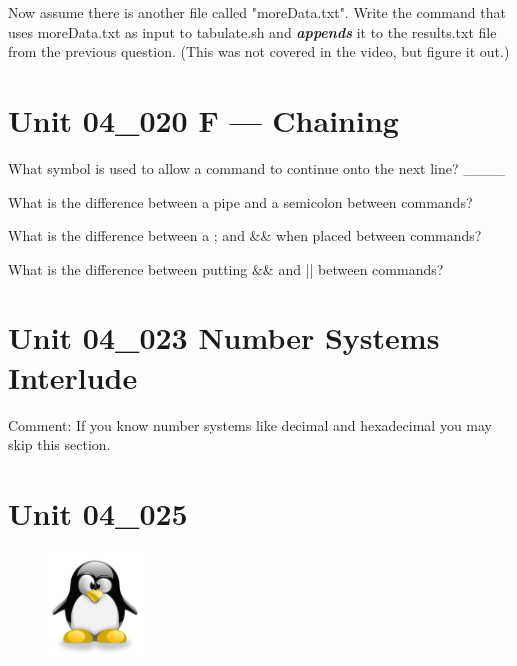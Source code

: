 \documentclass[letterpaper,12pt]{exam}
\newcommand{\unit}{Unit 04}
\begin{document}
\begin {questions}
\begin{samepage}
\question Now assume there is another file called "moreData.txt".  Write the command that uses moreData.txt as input to tabulate.sh and \textbf{\textit{appends}} it to the results.txt file from the previous question.  (This was not covered in the video, but figure it out.)
\vspace{5mm}
\end{samepage}

\section*{\unit\_020 F --- Chaining} %

\question What symbol is used to allow a command to continue onto the next line? \_\_\_\_

\question What is the difference between a pipe and a semicolon between commands?
\vspace{5 mm}

\question What is the difference between a ; and \&\& when placed between commands?
\vspace{5mm}

\question What is the difference between putting \&\& and || between commands?
\section*{\unit\_023 Number Systems Interlude} %

Comment:  If you know number systems like decimal and hexadecimal you may skip this section.

\section*{\unit\_025} %


\end{questions}
\begin{figure}[b]\label{end}
	\center
	\includegraphics[width=1in]{tux}
	{}
\end{figure}
\end{document}
